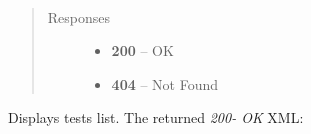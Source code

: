 \documentclass[letterpaper,10pt,english]{sphinxmanual}
\begin{document}

\begin{fulllineitems}
\label{01_how_to_use_it:method-get-tests}~\begin{quote}\begin{description}
\item[{Responses}] \leavevmode\begin{itemize}
\item {} 
\textbf{200} -- OK

\item {} 
\textbf{404} -- Not Found

\end{itemize}

\end{description}\end{quote}

Displays tests list.
The returned \emph{200- OK} XML:


\end{fulllineitems}
\end{document}
